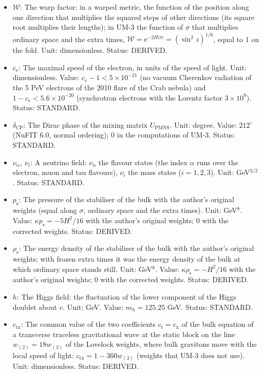 \documentclass[
  10pt,
]{article}
\begin{document}
\begin{itemize}
  are compact. Unit: length. Status: ASSUMED.
\item
  \(\mathcal{W}\): The warp factor: in a warped metric, the function of
  the position along one direction that multiplies the squared steps of
  other directions (its square root multiplies their lengths); in UM-3
  the function of \(\sigma\) that multiplies ordinary space and the
  extra times,
  \(\mathcal{W} = \mathrm{e}^{-2H\lvert\sigma\rvert} = (\sin^2z)^{1/6}\),
  equal to 1 on the fold. Unit: dimensionless. Status: DERIVED.
\item
  \(c_{\mathrm{e}}\): The maximal speed of the electron, in units of the
  speed of light. Unit: dimensionless. Value:
  \(c_{\mathrm{e}} - 1 < 5\times10^{-21}\) (no vacuum Cherenkov
  radiation of the 5 PeV electrons of the 2010 flare of the Crab nebula)
  and \(1 - c_{\mathrm{e}} < 5.6\times10^{-20}\) (synchrotron electrons
  with the Lorentz factor \(3\times10^9\)). Status: STANDARD.
\item
  \(\delta_{\mathrm{CP}}\): The Dirac phase of the mixing matrix
  \(U_{\mathrm{PMNS}}\). Unit: degree. Value: \(212^\circ\) (NuFIT 6.0,
  normal ordering); 0 in the computations of UM-3. Status: STANDARD.
\item
  \(\nu_\alpha,\ \nu_i\): A neutrino field: \(\nu_\alpha\) the flavour
  states (the index \(\alpha\) runs over the electron, muon and tau
  flavours), \(\nu_i\) the mass states (\(i = 1, 2, 3\)). Unit:
  GeV\(^{3/2}\). Status: STANDARD.
\item
  \(p_{\mathrm{s}}\): The pressure of the stabiliser of the bulk with
  the author's original weights (equal along \(\sigma\), ordinary space
  and the extra times). Unit: GeV\(^8\). Value:
  \(\kappa p_{\mathrm{s}} = -5H^2/16\) with the author's original
  weights; 0 with the corrected weights. Status: DERIVED.
\item
  \(\rho_{\mathrm{s}}\): The energy density of the stabiliser of the
  bulk with the author's original weights; with frozen extra times it
  was the energy density of the bulk at which ordinary space stands
  still. Unit: GeV\(^8\). Value: \(\kappa\rho_{\mathrm{s}} = -H^2/16\)
  with the author's original weights; 0 with the corrected weights.
  Status: DERIVED.
\item
  \(h\): The Higgs field: the fluctuation of the lower component of the
  Higgs doublet about \(v\). Unit: GeV. Value: \(m_h = 125.25\) GeV.
  Status: STANDARD.
\item
  \(c_{\mathrm{tx}}\): The common value of the two coefficients
  \(c_{\mathrm{t}} = c_{\mathrm{x}}\) of the bulk equation of a
  transverse traceless gravitational wave at the static block on the
  line \(w_{(2)} = 18w_{(3)}\) of the Lovelock weights, where bulk
  gravitons move with the local speed of light:
  \(c_{\mathrm{tx}} = 1 - 360w_{(3)}\) (weights that UM-3 does not use).
  Unit: dimensionless. Status: DERIVED.
\end{itemize}
\end{document}
